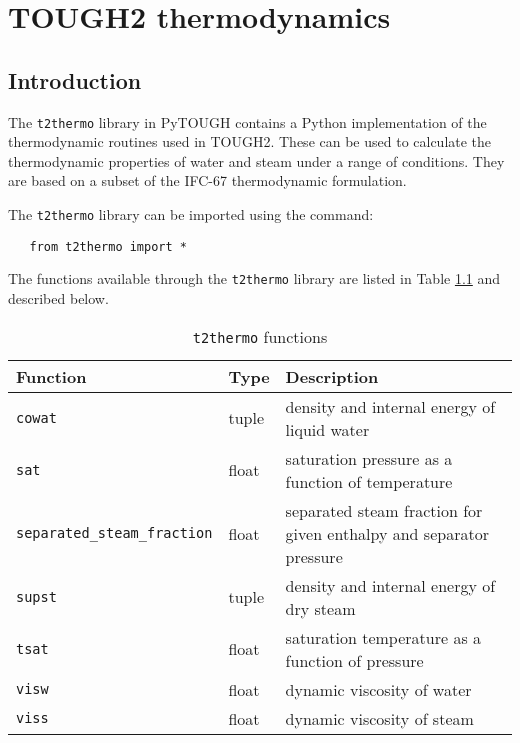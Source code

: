 \chapter{TOUGH2 thermodynamics}
\label{t2thermo}

\section{Introduction}
The \texttt{t2thermo} library in PyTOUGH contains a Python implementation of the thermodynamic routines used in TOUGH2.  These can be used to calculate the thermodynamic properties of water and steam under a range of conditions.  They are based on a subset of the IFC-67 thermodynamic formulation.

The \texttt{t2thermo} library can be imported using the command:

\begin{verbatim} 
   from t2thermo import *
\end{verbatim}

The functions available through the \texttt{t2thermo} library are listed in Table \ref{tb:t2thermo_functions} and described below.

\begin{table}
  \begin{center}
    \begin{tabular}{|l|l|p{65mm}|}
      \hline
      \textbf{Function} & \textbf{Type} & \textbf{Description}\\
      \hline
      \texttt{cowat} & tuple & density and internal energy of liquid water\\
      \texttt{sat} & float & saturation pressure as a function of temperature\\
      \texttt{separated\_steam\_fraction} & float & separated steam fraction for given enthalpy and separator pressure\\
      \texttt{supst} & tuple & density and internal energy of dry steam\\
      \texttt{tsat} & float & saturation temperature as a function of pressure\\
      \texttt{visw} & float & dynamic viscosity of water\\
      \texttt{viss} & float & dynamic viscosity of steam\\
      \hline
    \end{tabular}
    \caption{\texttt{t2thermo} functions}
    \label{tb:t2thermo_functions}
  \end{center}
\end{table}

